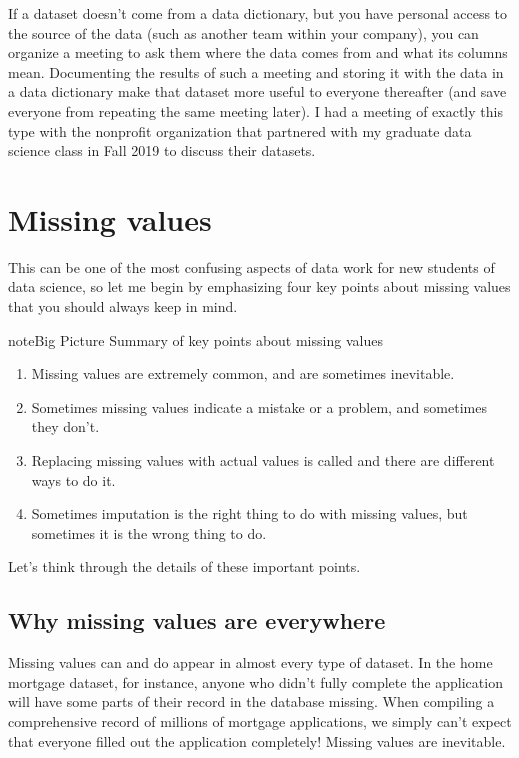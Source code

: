 \documentclass[letterpaper,10pt,english]{jupyterBook}
\begin{document}
\sphinxAtStartPar
If a dataset doesn’t come from a data dictionary, but you have personal access to the source of the data (such as another team within your company), you can organize a meeting to ask them where the data comes from and what its columns mean.  Documenting the results of such a meeting and storing it with the data in a data dictionary make that dataset more useful to everyone thereafter (and save everyone from repeating the same meeting later).  I had a meeting of exactly this type with the nonprofit organization that partnered with my graduate data science class in Fall 2019 to discuss their datasets.


\section{Missing values}
\label{\detokenize{chapter-13-etl:missing-values}}
\sphinxAtStartPar
This can be one of the most confusing aspects of data work for new students of data science, so let me begin by emphasizing four key points about missing values that you should always keep in mind.

\begin{sphinxadmonition}{note}{Big Picture \sphinxhyphen{} Summary of key points about missing values}
\begin{enumerate}
%
\item {} 
\sphinxAtStartPar
Missing values are extremely common, and are sometimes inevitable.

\item {} 
\sphinxAtStartPar
Sometimes missing values indicate a mistake or a problem, and sometimes they don’t.

\item {} 
\sphinxAtStartPar
Replacing missing values with actual values is called  and there are  different ways to do it.

\item {} 
\sphinxAtStartPar
Sometimes imputation is the right thing to do with missing values, but sometimes it is the wrong thing to do.

\end{enumerate}
\end{sphinxadmonition}

\sphinxAtStartPar
Let’s think through the details of these important points.


\subsection{Why missing values are everywhere}
\label{\detokenize{chapter-13-etl:why-missing-values-are-everywhere}}
\sphinxAtStartPar
Missing values can and do appear in almost every type of dataset.  In the home mortgage dataset, for instance, anyone who didn’t fully complete the application will have some parts of their record in the database missing.  When compiling a comprehensive record of millions of mortgage applications, we simply can’t expect that everyone filled out the application completely!  Missing values are inevitable.
\end{document}
